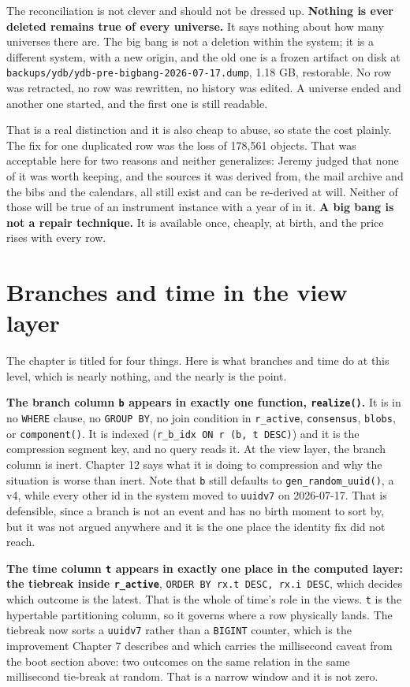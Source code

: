 The reconciliation is not clever and should not be dressed up. \textbf{Nothing is ever deleted remains true of every universe.} It says nothing about how many universes there are. The big bang is not a deletion within the system; it is a different system, with a new origin, and the old one is a frozen artifact on disk at \texttt{backups/ydb/ydb-pre-bigbang-2026-07-17.dump}, 1.18 GB, restorable. No row was retracted, no row was rewritten, no history was edited. A universe ended and another one started, and the first one is still readable.

That is a real distinction and it is also cheap to abuse, so state the cost plainly. The fix for one duplicated row was the loss of 178{,}561 objects. That was acceptable here for two reasons and neither generalizes: Jeremy judged that none of it was worth keeping, and the sources it was derived from, the mail archive and the bibs and the calendars, all still exist and can be re-derived at will. Neither of those will be true of an instrument instance with a year of \labRuns{} in it. \textbf{A big bang is not a repair technique.} It is available once, cheaply, at birth, and the price rises with every row.

\section{Branches and time in the view layer}

The chapter is titled for four things. Here is what branches and time do at this level, which is nearly nothing, and the nearly is the point.

\textbf{The branch column \texttt{b} appears in exactly one function, \texttt{realize()}.} It is in no \texttt{WHERE} clause, no \texttt{GROUP BY}, no join condition in \texttt{r\_active}, \texttt{consensus}, \texttt{blobs}, or \texttt{component()}. It is indexed (\texttt{r\_b\_idx ON r (b, t DESC)}) and it is the compression segment key, and no query reads it. At the view layer, the branch column is inert. Chapter 12 says what it is doing to compression and why the situation is worse than inert. Note that \texttt{b} still defaults to \texttt{gen\_random\_uuid()}, a v4, while every other id in the system moved to \texttt{uuidv7} on 2026-07-17. That is defensible, since a branch is not an event and has no birth moment to sort by, but it was not argued anywhere and it is the one place the identity fix did not reach.

\textbf{The time column \texttt{t} appears in exactly one place in the computed layer: the tiebreak inside \texttt{r\_active}}, \texttt{ORDER BY rx.t DESC, rx.i DESC}, which decides which outcome is the latest. That is the whole of time's role in the views. \texttt{t} is the hypertable partitioning column, so it governs where a row physically lands. The tiebreak now sorts a \texttt{uuidv7} rather than a \texttt{BIGINT} counter, which is the improvement Chapter 7 describes and which carries the millisecond caveat from the boot section above: two outcomes on the same relation in the same millisecond tie-break at random. That is a narrow window and it is not zero.

